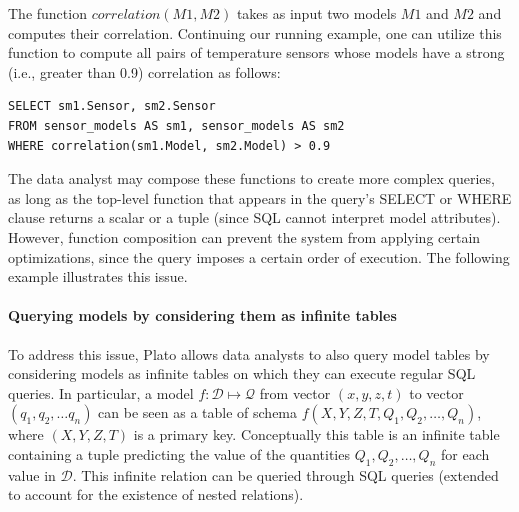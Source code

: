 \vspace*{0.5cm}
\begin{example}
The function $correlation(M1, M2)$ takes as input two models $M1$ and $M2$ and computes their correlation. Continuing our running example, one can utilize this function to compute all pairs of temperature sensors whose models have a strong (i.e., greater than 0.9) correlation as follows:
\begin{verbatim}
SELECT sm1.Sensor, sm2.Sensor
FROM sensor_models AS sm1, sensor_models AS sm2
WHERE correlation(sm1.Model, sm2.Model) > 0.9 
\end{verbatim}
\end{example}
\vspace*{0.5cm}

The data analyst may compose these functions to create more complex queries, as long as the top-level function that appears in the query's SELECT or WHERE clause returns a scalar or a tuple (since SQL cannot interpret model attributes). However, function composition can prevent the system from applying certain optimizations, since the query imposes a certain order of execution. The following example illustrates this issue.

\vspace*{0.5cm}
\begin{example}
\end{example}
\vspace*{0.5cm}

\paragraph{Querying models by considering them as infinite tables} To address this issue, Plato allows data analysts to also query model tables by considering models as infinite tables on which they can execute regular SQL queries. In particular, a model $f: \mathcal{D} \mapsto \mathcal{Q}$ from vector $(x, y, z, t)$ to vector $(q_1, q_2, \ldots q_n)$ can be seen as a table of schema $f(X, Y, Z, T, Q_1, Q_2, \ldots, Q_n)$, where $(X, Y, Z, T)$ is a primary key. Conceptually this table is an infinite table containing a tuple predicting the value of the quantities $Q_1, Q_2, \ldots, Q_n$ for each value in $\mathcal{D}$.  This infinite relation can be queried through SQL queries (extended to account for the existence of nested relations).


